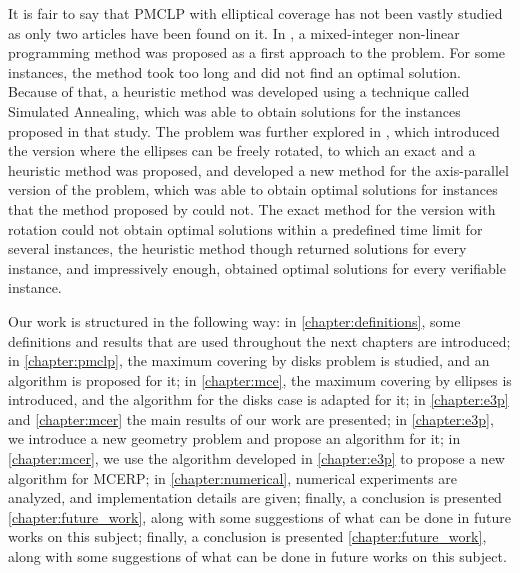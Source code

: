 It is fair to say that PMCLP with elliptical coverage has not been vastly studied as only two articles have been found on it. In , a mixed-integer non-linear programming method was proposed as a first approach to the problem. For some instances, the method took too long and did not find an optimal solution. Because of that, a heuristic method was developed using a technique called Simulated Annealing, which was able to obtain solutions for the instances proposed in that study.
The problem was further explored in , which introduced the version where the ellipses can be freely rotated, to which an exact and a heuristic method was proposed, and developed a new method for the axis-parallel version of the problem, which was able to obtain optimal solutions for instances that the method proposed by  could not.
The exact method for the version with rotation could not obtain optimal solutions within a predefined time limit for several instances, the heuristic method though returned solutions for every instance, and impressively enough, obtained optimal solutions for every verifiable instance.

Our work is structured in the following way: in \autoref{chapter:definitions}, some definitions and results that are used throughout the next chapters are introduced; in \autoref{chapter:pmclp}, the maximum covering by disks problem is studied, and an algorithm is proposed for it; in \autoref{chapter:mce}, the maximum covering by ellipses is introduced, and the algorithm for the disks case is adapted for it; in \autoref{chapter:e3p} and  \autoref{chapter:mcer} the main results of our work are presented; in \autoref{chapter:e3p}, we introduce a new geometry problem and propose an algorithm for it;
in \autoref{chapter:mcer}, we use the algorithm developed in \autoref{chapter:e3p} to propose a new algorithm for MCERP; 
in \autoref{chapter:numerical}, numerical experiments are analyzed, and implementation details are given; finally, a conclusion is presented \autoref{chapter:future_work}, along with some suggestions of what can be done in future works on this subject; finally, a conclusion is presented \autoref{chapter:future_work}, along with some suggestions of what can be done in future works on this subject.